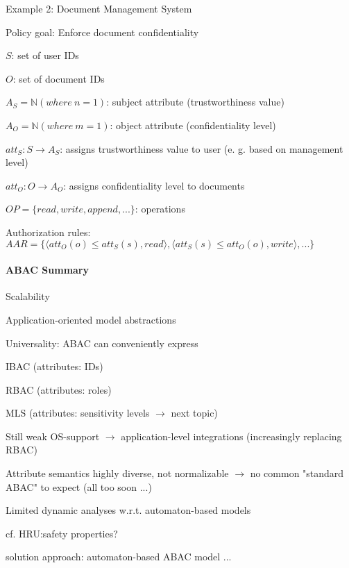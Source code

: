 \documentclass[a4paper]{article}
\begin{document}
\begin{multicols}{3}
    Example 2: Document Management System
    \begin{itemize*}
        \item Policy goal: Enforce document confidentiality
        \item $S$: set of user IDs
        \item $O$: set of document IDs
        \item $A_S=\mathbb{N}(where\ n=1)$: subject attribute (trustworthiness value)
        \item $A_O=\mathbb{N}(where\ m=1)$: object attribute (confidentiality level)
        \item $att_S:S\rightarrow A_S$: assigns trustworthiness value to user (e. g. based on management level)
        \item $att_O:O\rightarrow A_O$: assigns confidentiality level to documents
        \item $OP=\{read,write,append,...\}$: operations
        \item Authorization rules: $AAR=\{⟨att_O(o)\leq att_S(s),read⟩,⟨att_S(s) \leq att_O(o),write⟩,...\}$
    \end{itemize*}

    \paragraph{ABAC Summary}
    \begin{itemize*}
        \item Scalability
        \item Application-oriented model abstractions
        \item Universality: ABAC can conveniently express
              \begin{itemize*}
                  \item IBAC (attributes: IDs)
                  \item RBAC (attributes: roles)
                  \item MLS (attributes: sensitivity levels $\rightarrow$ next topic)
              \end{itemize*}
        \item Still weak OS-support $\rightarrow$ application-level integrations (increasingly replacing RBAC)
        \item Attribute semantics highly diverse, not normalizable $\rightarrow$ no common "standard ABAC" to expect (all too soon ...)
        \item Limited dynamic analyses w.r.t. automaton-based models
              \begin{itemize*}
                  \item cf. HRU:safety properties?
                  \item solution approach: automaton-based ABAC model ...
              \end{itemize*}
    \end{itemize*}


\end{multicols}
\end{document}
